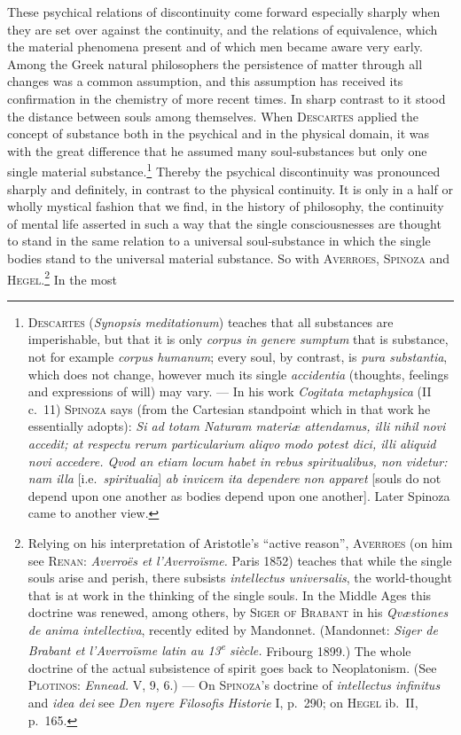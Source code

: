 \documentclass[12pt,a4paper]{book}
\begin{document}
These psychical relations of discontinuity come forward especially sharply when
they are set over against the continuity, and the relations of equivalence,
which the material phenomena present and of which men became aware very early.
Among the Greek natural philosophers the persistence of matter through all
changes was a common assumption, and this assumption has received its
confirmation in the chemistry of more recent times. In sharp contrast to it
stood the distance between souls among themselves. When \textsc{Descartes}
applied the concept of substance both in the psychical and in the physical
domain, it was with the great difference that he assumed many soul-substances
but only one single material substance.\footnote{\textsc{Descartes}
(\textit{Synopsis meditationum}) teaches that all substances are imperishable,
but that it is only \textit{corpus in genere sumptum} that is substance, not for
example \textit{corpus humanum}; every soul, by contrast, is \textit{pura
substantia}, which does not change, however much its single \textit{accidentia}
(thoughts, feelings and expressions of will) may vary. --- In his work
\textit{Cogitata metaphysica} (II c.~11) \textsc{Spinoza} says (from the
Cartesian standpoint which in that work he essentially adopts): \textit{Si ad
totam Naturam materiæ attendamus, illi nihil novi accedit; at respectu rerum
particularium aliqvo modo potest dici, illi aliquid novi accedere. Qvod an etiam
locum habet in rebus spiritualibus, non videtur: nam illa} [i.e.\
\textit{spiritualia}] \textit{ab invicem ita dependere non apparet} [souls do not
depend upon one another as bodies depend upon one another]. Later Spinoza came
to another view.} Thereby the psychical discontinuity was pronounced sharply and
definitely, in contrast to the physical continuity. It is only in a half or
wholly mystical fashion that we find, in the history of philosophy, the
continuity of mental life asserted in such a way that the single consciousnesses
are thought to stand in the same relation to a universal soul-substance in which
the single bodies stand to the universal material substance. So with
\textsc{Averroes}, \textsc{Spinoza} and \textsc{Hegel}.\footnote{Relying on his
interpretation of Aristotle's ``active reason'', \textsc{Averroes} (on him see
\textsc{Renan}: \textit{Averroës et l'Averroïsme.} Paris 1852) teaches that while
the single souls arise and perish, there subsists \textit{intellectus
universalis}, the world-thought that is at work in the thinking of the single
souls. In the Middle Ages this doctrine was renewed, among others, by
\textsc{Siger of Brabant} in his \textit{Qvæstiones de anima intellectiva},
recently edited by Mandonnet. (Mandonnet: \textit{Siger de Brabant et
l'Averroïsme latin au 13\textsuperscript{e} siècle.} Fribourg 1899.) The whole
doctrine of the actual subsistence of spirit goes back to Neoplatonism. (See
\textsc{Plotinos}: \textit{Ennead.} V, 9, 6.) --- On \textsc{Spinoza}'s doctrine
of \textit{intellectus infinitus} and \textit{idea dei} see \textit{Den nyere
Filosofis Historie} I, p.~290; on \textsc{Hegel} ib.\ II, p.~165.} In the most
\end{document}
